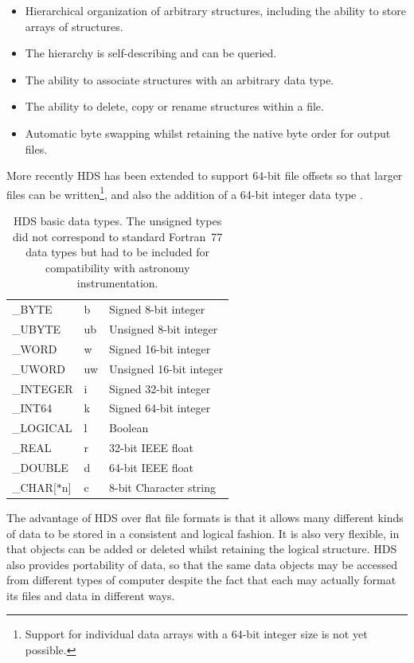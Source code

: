 \documentclass[final,authoryear,5p,times,twocolumn]{elsarticle}
\begin{document}
\begin{itemize}
\item Hierarchical organization of arbitrary structures, including the
  ability to store arrays of structures.
\item The hierarchy is self-describing and can be queried.
\item The ability to associate structures with an arbitrary data type.
\item The ability to delete, copy or rename structures within a file.
\item Automatic byte swapping whilst retaining the native byte order
  for output files.
\end{itemize}

More recently HDS has been extended to support 64-bit file offsets so
that larger files can be written\footnote{Support for individual data
  arrays with a 64-bit integer size is not yet possible.}, and also the
addition of a 64-bit integer data type \citep{P82_adassxxiii}.

\begin{table}
\caption{HDS basic data types. The unsigned types did not correspond
  to standard Fortran~77 data types but had to be included for
  compatibility with astronomy instrumentation.}
\label{tab:hdstypes}
\begin{center}
\begin{tabular}{lll}
\hline
\_BYTE & b & Signed 8-bit integer \\
\_UBYTE & ub & Unsigned 8-bit integer \\
\_WORD & w & Signed 16-bit integer \\
\_UWORD & uw & Unsigned 16-bit integer \\
\_INTEGER & i & Signed 32-bit integer \\
\_INT64 & k &Signed 64-bit integer \\
\_LOGICAL & l & Boolean \\
\_REAL & r & 32-bit IEEE float \\
\_DOUBLE & d & 64-bit IEEE float \\
\_CHAR[$*$n] & c & 8-bit Character string \\
\hline
\end{tabular}
\end{center}
\end{table}

The advantage of HDS over flat file formats is that it allows many different kinds of data to
be stored in a consistent and logical fashion. It is also very
flexible, in that objects can be added or deleted whilst retaining the
logical structure. HDS also provides portability of data, so that the
same data objects may be accessed from different types of computer
despite the fact that each may actually format its files and data in
different ways.
\end{document}
